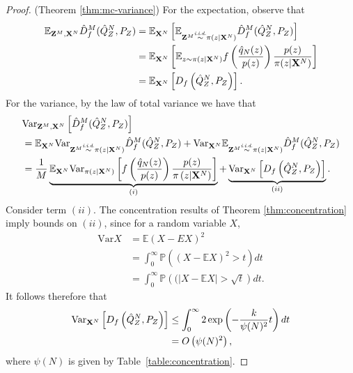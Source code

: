 \begin{proof}(Theorem \ref{thm:mc-variance})
For the expectation, observe that
%
\begin{align*}
    \mathbb{E}_{\mathbf{Z}^M, \mathbf{X}^N} \hat{D}^M_f( \hat{Q}_Z^N , P_Z)
    &=\mathbb{E}_{\mathbf{X}^N} \left[ \mathbb{E}_{\mathbf{Z}^M \overset{\text{\emph{i.i.d.}}}{\sim} \pi(z | \mathbf{X}^N)} \hat{D}^M_f( \hat{Q}_Z^N , P_Z)\right] \\
    &= \mathbb{E}_{\mathbf{X}^N} \left[ \mathbb{E}_{z \sim \pi(z | \mathbf{X}^N)} f\left(\frac{\hat{q}_N(z)}{p(z)} \right) \frac{p(z)}{\pi(z|\mathbf{X}^N)} \right] \\
    &=\mathbb{E}_{\mathbf{X}^N} \left[ D_f\left( \hat{Q}^N_Z , P_Z \right)\right].
\end{align*}
%
For the variance, by the law of total variance we have that
%
\begin{align*}
    &\text{Var}_{\mathbf{Z}^M, \mathbf{X}^N} \left[\hat{D}^M_f( \hat{Q}_Z^N , P_Z)  \right]  \\
    &= \mathbb{E}_{\mathbf{X}^N} \text{Var}_{\mathbf{Z}^M \overset{\text{\emph{i.i.d.}}}{\sim} \pi(z|\mathbf{X}^N)} \hat{D}^M_f( \hat{Q}_Z^N , P_Z) + \text{Var}_{\mathbf{X}^N} \mathbb{E}_{\mathbf{Z}^M \overset{\text{\emph{i.i.d.}}}{\sim} \pi(z|\mathbf{X}^N)} \hat{D}^M_f( \hat{Q}_Z^N , P_Z)
    \\
    &=\frac{1}{M} \underbrace{\mathbb{E}_{\mathbf{X}^N} \text{Var}_{\pi(z|\mathbf{X}^N)} \left[ f\left( \frac{\hat{q}_N(z)}{p(z)} \right) \frac{p(z)}{\pi\left(z|\mathbf{X}^N\right)} \right]}_{(i)}  + \underbrace{\text{Var}_{\mathbf{X}^N} \left[D_f\left( \hat{Q}^N_Z , P_Z \right)\right]}_{(ii)}.
\end{align*}
%
Consider term $(ii)$.
The concentration results of Theorem \ref{thm:concentration} imply bounds on $(ii)$, since for a random variable $X$,
\begin{align*}
    \text{Var}X &= \mathbb{E} (X - EX)^2 \\
    &= \int_0^\infty \mathbb{P}\left( (X - \mathbb{E} X)^2 > t \right) dt \\
    &= \int_0^\infty \mathbb{P} \left(( \left| X - \mathbb{E} X \right| > \sqrt{t} \right) dt.
\end{align*}
It follows therefore that
\begin{align*}
    \text{Var}_{\mathbf{X}^N} \left[D_f\left( \hat{Q}^N_Z , P_Z \right)\right] 
    &\leq \int_0^\infty 2 \exp\left( -\frac{k}{\psi(N)^2}t \right) dt\\
    &= O\left(\psi(N)^2 \right),
\end{align*}
where $\psi(N)$ is given by Table~\ref{table:concentration}.


\end{proof}
